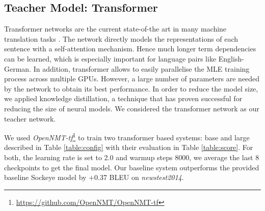 \documentclass[11pt,a4paper]{article}
\begin{document}
\subsection{Teacher Model: Transformer}
\label{transformer}

Transformer networks \cite{vaswani2017attention} are the current state-of-the art in many machine translation tasks \cite{DBLP:journals/corr/abs-1803-02155}.
The network directly models the representations of each sentence
with a self-attention mechanism.  Hence much longer term dependencies
can be learned, which is especially important for language pairs like
English-German.
In addition, transformer allows to easily parallelise the MLE training process across multiple GPUs.
However, a large number of parameters are needed by the network to obtain its best performance.
In order to reduce the model size, we applied knowledge distillation, a technique that has proven successful for reducing the size of neural models. We considered the transformer network as our teacher network.



We used \textit{OpenNMT-tf}\footnote{\url{https://github.com/OpenNMT/OpenNMT-tf}}
to train two transformer based systems: base and large described in
Table \ref{table:config} with their evaluation in Table \ref{table:score}. For both, the
learning rate is set to 2.0 and warmup steps 8000, we average the last
8 checkpoints to get the final model. Our baseline system outperforms
the provided baseline Sockeye model by +0.37 BLEU on {\it newstest2014}.
\end{document}
